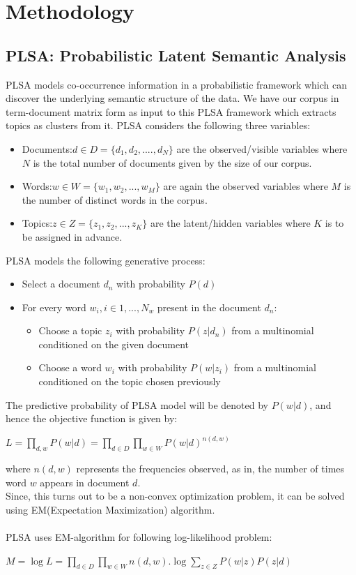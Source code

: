 \documentclass{article}
\begin{document}
\section{Methodology}
\subsection{PLSA: Probabilistic Latent Semantic Analysis}
PLSA models co-occurrence information in a probabilistic framework which can discover the underlying semantic structure of the data. We have our corpus in term-document matrix form as input to this PLSA framework which extracts topics as clusters from it. PLSA considers the following three variables:
\begin{itemize}
\item Documents:$d \in D=\{d_1,d_2,....,d_N\}$ are the observed/visible variables where $N$ is the total number of documents given by the size of our corpus.
\item Words:$w \in W=\{w_1,w_2,...,w_M\}$ are again the observed variables where $M$ is the number of distinct words in the corpus.
\item Topics:$z \in Z=\{z_1,z_2,...,z_K\}$ are the latent/hidden variables where $K$ is to be assigned in advance. \\
\end{itemize}
PLSA models the following generative process:
\begin{itemize}
\item Select a document $d_n$ with probability $P(d)$
\item For every word $w_i, i \in {1,...,N_w}$ present in the document $d_n$:
\begin{itemize}
\item Choose a topic $z_i$ with probability $P(z|d_n)$ from a multinomial conditioned on the given document
\item Choose a word $w_i$ with probability $P(w|z_i)$ from a multinomial conditioned on the topic chosen previously\\
\end{itemize}
\end{itemize}

The predictive probability of PLSA model will be denoted by $P(w|d)$, and hence the objective function is given by:
\begin{center}
$L=\prod_{d,w}P(w|d)=\prod_{d \in D}\prod_{w \in W}P(w|d)^{n(d,w)}$
\end{center}
where $n(d,w)$ represents the frequencies observed, as in, the number of times word $w$ appears in document $d$.\\
Since, this turns out to be a non-convex optimization problem, it can be solved using EM(Expectation Maximization) algorithm.\\\\
PLSA uses EM-algorithm for following log-likelihood problem:\\
\begin{center}
$M=\log L=\prod_{d \in D}\prod_{w \in W}n(d,w).\log \sum_{z \in Z}P(w|z)P(z|d)$
\end{center}
\end{document}
